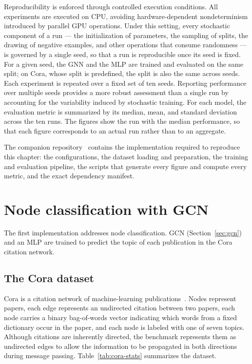 Reproducibility is enforced through controlled execution conditions.
All experiments are executed on CPU, avoiding hardware-dependent
nondeterminism introduced by parallel GPU operations. Under this setting,
every stochastic component of a run --- the initialization of parameters,
the sampling of splits, the drawing of negative examples, and other
operations that consume randomness --- is governed by a single seed,
so that a run is reproducible once its seed is fixed.
For a given seed, the GNN and the MLP are trained and evaluated on the same
split; on Cora, whose split is predefined, the split is also the same across seeds.
Each experiment is repeated over a fixed set of ten seeds. Reporting
performance over multiple seeds provides a more robust assessment
than a single run by accounting for the variability induced
by stochastic training. For each model, the evaluation metric is summarized by
its median, mean, and standard deviation across the ten runs. The figures show the run
with the median performance, so that each figure corresponds to an actual run
rather than to an aggregate.

The companion repository~\cite{macias2026} contains the implementation required
to reproduce this chapter: the configurations, the dataset loading
and preparation, the training and evaluation pipeline, the scripts that generate every
figure and compute every metric, and the exact dependency manifest. 

\section{Node classification with GCN}
\label{sec:gcn-implementation}

The first implementation addresses node classification. GCN
(Section~\ref{sec:gcn}) and an MLP are trained to predict the topic of
each publication in the Cora citation network.

\subsection{The Cora dataset}
\label{sec:cora-dataset}

Cora is a citation network of machine-learning publications~\cite{sen2008}.
Nodes represent papers, each edge represents an undirected citation
between two papers, each node carries a binary bag-of-words vector
indicating which words from a fixed dictionary occur in the paper, and each node
is labeled with one of seven topics. Although citations are inherently directed,
the benchmark represents them as undirected edges to allow the information
to be propagated in both directions during message passing.
Table~\ref{tab:cora-stats} summarizes the dataset.

